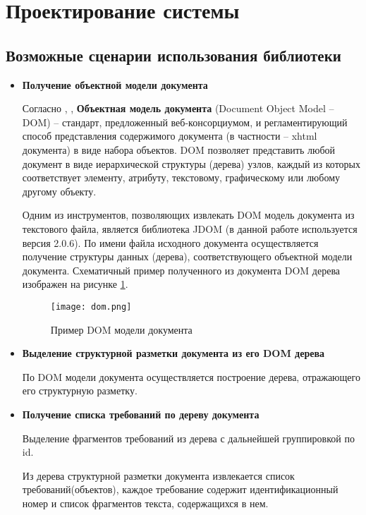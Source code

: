 \section{Проектирование системы}
\label{sec:Chapter3} 
\subsection{Возможные сценарии использования библиотеки}
\begin{itemize}
\item \textbf{Получение объектной модели документа}

Согласно \cite{book:DOM}, \cite{book:JDOM}, \textbf{Объектная модель документа} (Document Object Model – DOM) – стандарт, предложенный веб-консорциумом, и регламентирующий способ представления содержимого документа (в частности – xhtml документа) в виде набора объектов. DOM позволяет представить любой документ в виде иерархической структуры (дерева) узлов, каждый из которых соответствует элементу, атрибуту, текстовому, графическому или любому другому объекту.

Одним из инструментов, позволяющих извлекать DOM модель документа из текстового файла, является библиотека JDOM (в данной работе используется версия 2.0.6).
По имени файла исходного документа осуществляется получение структуры данных (дерева), соответствующего объектной модели документа. Схематичный пример полученного из документа DOM дерева изображен на рисунке \ref{pr:image4}.

\begin{figure}[h]
\begin{center}
\texttt{[image: dom.png]}
\caption{Пример DOM модели документа}
\label{pr:image4}
\end{center}
\end{figure}

\item \textbf{Выделение структурной разметки документа из его DOM дерева}

По DOM модели документа осуществляется построение дерева, отражающего его структурную разметку.

\item \textbf{Получение списка требований по дереву документа}

Выделение фрагментов требований из дерева с дальнейшей группировкой по id. 

Из дерева структурной разметки документа извлекается список требований(объектов), каждое требование содержит идентификационный номер и список фрагментов текста, содержащихся в нем.


\end{itemize}
